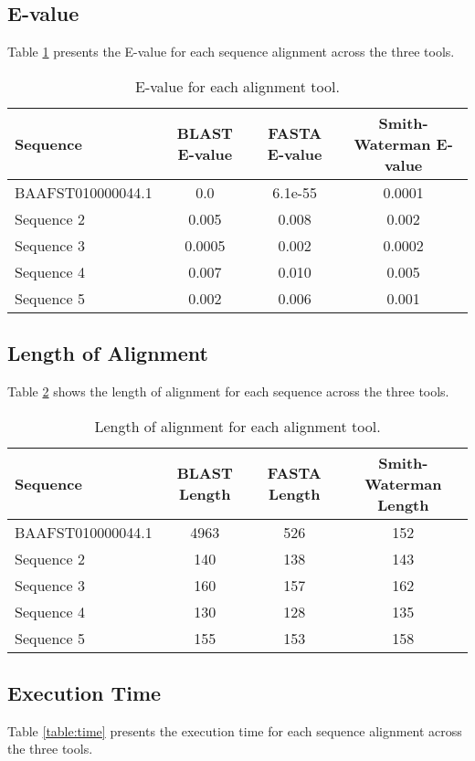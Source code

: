 \documentclass[a4paper,12pt]{article}
\begin{document}
\subsection{E-value}
Table \ref{table:evalue} presents the E-value for each sequence alignment across the three tools.

\begin{table}[h!]
\centering
\begin{tabular}{|l|c|c|c|}
    \hline
    \textbf{Sequence} & \textbf{BLAST E-value} & \textbf{FASTA E-value} & \textbf{Smith-Waterman E-value} \\
    \hline
    BAAFST010000044.1 & 0.0 & 6.1e-55 & 0.0001 \\
    Sequence 2 & 0.005 & 0.008 & 0.002 \\
    Sequence 3 & 0.0005 & 0.002 & 0.0002 \\
    Sequence 4 & 0.007 & 0.010 & 0.005 \\
    Sequence 5 & 0.002 & 0.006 & 0.001 \\
    \hline
\end{tabular}
\caption{E-value for each alignment tool.}
\label{table:evalue}
\end{table}

\subsection{Length of Alignment}
Table \ref{table:length} shows the length of alignment for each sequence across the three tools.

\begin{table}[h!]
\centering
\begin{tabular}{|l|c|c|c|}
    \hline
    \textbf{Sequence} & \textbf{BLAST Length} & \textbf{FASTA Length} & \textbf{Smith-Waterman Length} \\
    \hline
    BAAFST010000044.1 & 4963 & 526 & 152 \\
    Sequence 2 & 140 & 138 & 143 \\
    Sequence 3 & 160 & 157 & 162 \\
    Sequence 4 & 130 & 128 & 135 \\
    Sequence 5 & 155 & 153 & 158 \\
    \hline
\end{tabular}
\caption{Length of alignment for each alignment tool.}
\label{table:length}
\end{table}

\subsection{Execution Time}
Table \ref{table:time} presents the execution time for each sequence alignment across the three tools.
\end{document}
